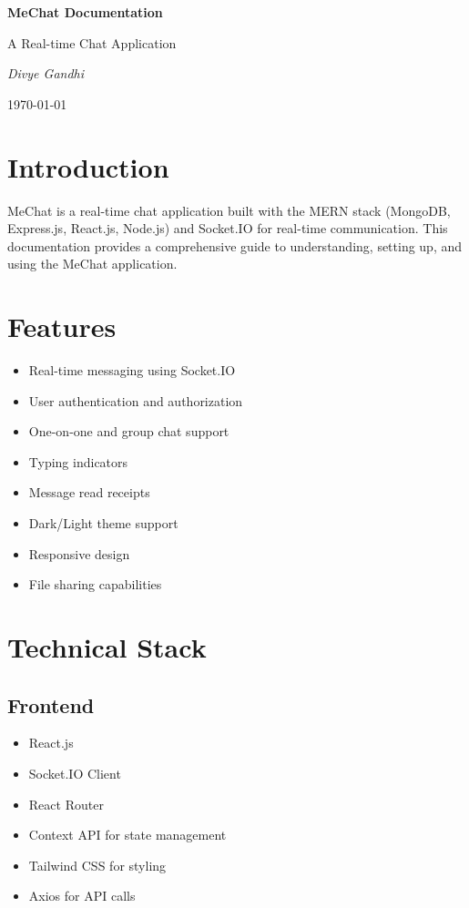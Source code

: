 \documentclass[12pt,a4paper]{article}
\begin{document}
\begin{titlepage}
    \centering
    \vspace*{2cm}
    {\Huge\bfseries MeChat Documentation\par}
    \vspace{1cm}
    {\Large A Real-time Chat Application\par}
    \vspace{2cm}
    {\Large\itshape Divye Gandhi\par}
    \vfill
    {\large \today\par}
\end{titlepage}

\tableofcontents
\newpage

\section{Introduction}
MeChat is a real-time chat application built with the MERN stack (MongoDB, Express.js, React.js, Node.js) and Socket.IO for real-time communication. This documentation provides a comprehensive guide to understanding, setting up, and using the MeChat application.

\section{Features}
\begin{itemize}
    \item Real-time messaging using Socket.IO
    \item User authentication and authorization
    \item One-on-one and group chat support
    \item Typing indicators
    \item Message read receipts
    \item Dark/Light theme support
    \item Responsive design
    \item File sharing capabilities
\end{itemize}

\section{Technical Stack}
\subsection{Frontend}
\begin{itemize}
    \item React.js
    \item Socket.IO Client
    \item React Router
    \item Context API for state management
    \item Tailwind CSS for styling
    \item Axios for API calls
\end{itemize}
\end{document}
